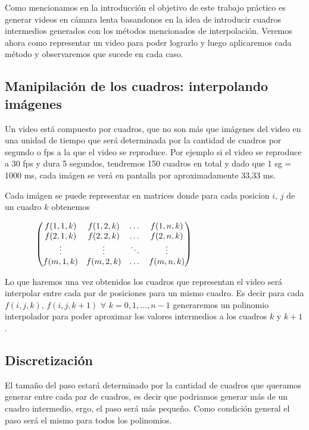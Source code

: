 Como mencionamos en la introducción el objetivo de este trabajo práctico es generar videos en cámara lenta basandonos en la idea de introducir cuadros intermedios generados con los métodos mencionados de interpolación. Veremos ahora como representar un video para poder lograrlo y luego aplicaremos cada método y observaremos que sucede en cada caso.

\subsection{Manipilación de los cuadros: interpolando imágenes}

Un video está compuesto por cuadros, que no son más que imágenes del video en una unidad de tiempo que será determinada por la cantidad de cuadros por segundo o fps a la que el video se reproduce.
Por ejemplo si el video se reproduce a 30 fps y dura 5 segundos, tendremos 150 cuadros en total y dado que 1 sg = 1000 ms, cada imágen se verá en pantalla por aproximadamente 33,33 ms.

Cada imágen se puede representar en matrices donde para cada posicion $i$, $j$ de un cuadro $k$ obtenemos 

\vspace{4mm}

$
\hspace{1.3cm}
     \begin{pmatrix}
      f(1, 1, k) & f(1, 2, k) & \dots & f(1, n, k) \\
	  f(2, 1, k) & f(2, 2, k) & \dots & f(2, n, k) \\
	  \vdots & \vdots & \ddots & \vdots \\
	  f(m, 1, k) & f(m, 2, k) & \dots & f(m, n, k) \\
     \end{pmatrix}
$

\vspace{4mm}

Lo que haremos una vez obtenidos los cuadros que representan el video será interpolar entre cada par de posiciones para un mismo cuadro. Es decir para cada $f(i, j, k)$, $f(i, j, k+1)$ $\forall$ $k = 0, 1, \dots, n-1$ generaremos un polinomio interpolador para poder aproximar los valores intermedios a los cuadros $k$ y $k+1$.

\subsection{Discretización}

El tamaño del paso estará determinado por la cantidad de cuadros que queramos generar entre cada par de cuadros, es decir que podriamos generar más de un cuadro intermedio, ergo, el paso será más pequeño. Como condición general el paso será el mismo para todos los polinomios. 

